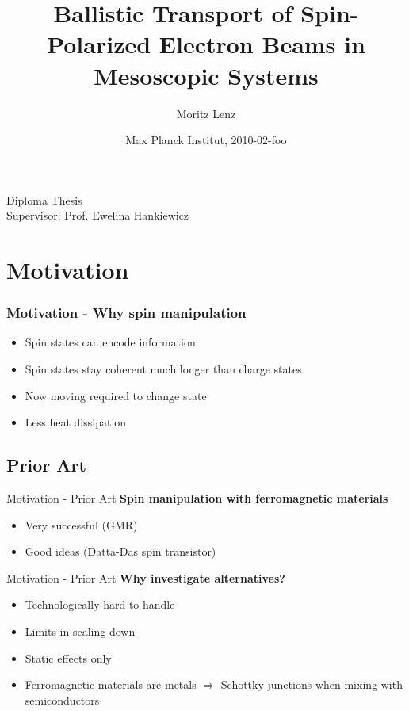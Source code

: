 \documentclass{beamer}
\title{Ballistic Transport of Spin-Polarized Electron Beams in Mesoscopic
Systems}
\author{Moritz Lenz}
\institute{Institut für Theoretische Physik und Astrophysik, Universität
Würzburg}
\date{Max Planck Institut, 2010-02-foo}
\begin{document}
\begin{frame}
  \titlepage

  \begin{center}
{ 	
	\large Diploma Thesis\\[2em]
}
    Supervisor: Prof. Ewelina Hankiewicz

\end{center}

%

\end{frame}

\section{Motivation}

\begin{frame}
    \frametitle{Motivation - Why spin manipulation}

	\begin{itemize}
		\item Spin states can encode information
		\item Spin states stay coherent much longer than charge states
        \item Now moving required to change state
        \item Less heat dissipation
	\end{itemize}

\end{frame}

\subsection{Prior Art}

\begin{frame}{Motivation - Prior Art}
    \textbf{Spin manipulation with ferromagnetic materials}

	\begin{itemize}
		\item Very successful (GMR)
		\item Good ideas (Datta-Das spin transistor)
	\end{itemize}
\end{frame}

\begin{frame}{Motivation - Prior Art}
    \textbf{Why investigate alternatives?}

	\begin{itemize}
		\item Technologically hard to handle
        \item Limits in scaling down
        \item Static effects only
		\item Ferromagnetic materials are metals
            $\Rightarrow$ Schottky junctions when mixing with semiconductors
	\end{itemize}
\end{frame}
\end{document}
